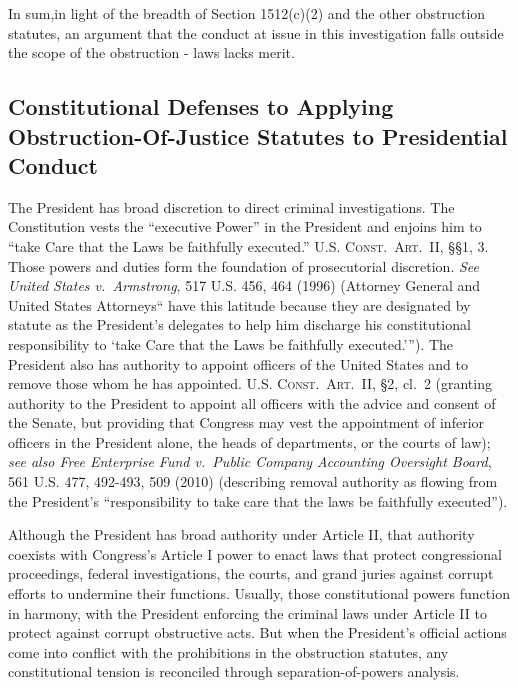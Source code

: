 \hr

In sum,in light of the breadth of Section 1512(c)(2) and the other obstruction statutes, an argument that the conduct at issue in this investigation falls outside the scope of the obstruction - laws lacks merit.

\subsection{Constitutional Defenses to Applying Obstruction-Of-Justice Statutes to Presidential Conduct}

The President has broad discretion to direct criminal investigations.
The Constitution vests the “executive Power” in the President and enjoins him to “take Care that the Laws be faithfully executed.” \textsc{U.S. Const.\ Art.~II}, \S\S 1, 3.
Those powers and duties form the foundation of prosecutorial discretion.
\textit{See United States v.\ Armstrong}, 517 U.S. 456, 464 (1996) (Attorney General and United States Attorneys“ have this latitude because they are designated by statute as the President’s delegates to help him discharge his constitutional responsibility to ‘take Care that the Laws be faithfully executed.’”).
The President also has authority to appoint officers of the United States and to remove those whom he has appointed.
\textsc{U.S. Const.\ Art.~II}, \S 2, cl.~2 (granting authority to the President to appoint all officers with the advice and consent of the Senate, but providing that Congress may vest the appointment of inferior officers in the President alone, the heads of departments, or the courts of law);
\textit{see also Free Enterprise Fund v.\ Public Company Accounting Oversight Board}, 561 U.S. 477, 492-493, 509 (2010) (describing removal authority as flowing from the President’s “responsibility to take care that the laws be faithfully executed”).

Although the President has broad authority under Article II, that authority coexists with Congress’s Article I power to enact laws that protect congressional proceedings, federal investigations, the courts, and grand juries against corrupt efforts to undermine their functions.
Usually, those constitutional powers function in harmony, with the President enforcing the criminal laws under Article II to protect against corrupt obstructive acts.
But when the President’s official actions come into conflict with the prohibitions in the obstruction statutes, any constitutional tension is reconciled through separation-of-powers analysis.


